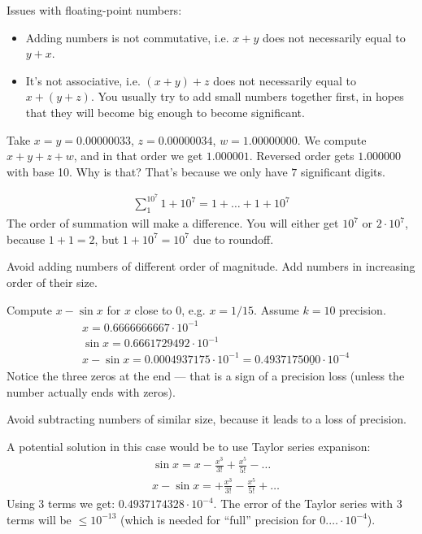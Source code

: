 Issues with floating-point numbers:
\begin{itemize}
    \item {
        Adding numbers is not commutative, i.e.
        $x + y$ does not necessarily equal to $y + x$.
    }
    \item {
        It's not associative, i.e.
        $(x + y) + z$ does not necessarily equal to $x + (y + z)$.
        You usually try to add small numbers together first, in hopes that they 
        will become big enough to become significant.
    }
\end{itemize}
\begin{example}[1]
    Take $x = y = 0.00000033$, $z = 0.00000034$, $w = 1.00000000$.
    We compute $x + y + z + w$, and in that order we get $1.000001$.
    Reversed order gets $1.000000$ with base 10. Why is that?
    That's because we only have $7$ significant digits.
\end{example}
\begin{example}[2]
    \begin{align*}
        \sum_{1}^{10^7} 1 + 10^7 = 1 + \dots + 1 + 10^7
    \end{align*}
    The order of summation will make a difference. You will either get 
    $10^7$ or $2 \cdot 10^7$, because $1 + 1 = 2$, but $1 + 10^7 = 10^7$
    due to roundoff.
\end{example}
\begin{consequence}
    Avoid adding numbers of different order of magnitude.
    Add numbers in increasing order of their size.
\end{consequence}
\begin{example}[3]
    Compute $x - \sin{x}$ for $x$ close to $0$, e.g. $x = 1 / 15$.
    Assume $k = 10$ precision.
    \begin{align*}
        &
        x = 0.6666666667 \cdot 10^{-1}
        \\&
        \sin{x} = 0.6661729492 \cdot 10^{-1}
        \\&
        x - \sin{x} = 0.0004937175 \cdot 10^{-1} = 
        0.4937175\underline{000} \cdot 10^{-4}
    \end{align*}
    Notice the three zeros at the end --- that is a sign of 
    a precision loss (unless the number actually ends with zeros).
    \begin{consequence}
        Avoid subtracting numbers of similar size, because it leads to
        a loss of precision.
    \end{consequence}
    A potential solution in this case would be to use Taylor series expanison:
    \begin{align*}
        &
        \sin{x} = x - \frac{x^3}{3!} + \frac{x^5}{5!} - \dots
        \\&
        x - \sin{x} = +\frac{x^3}{3!} - \frac{x^5}{5!} + \dots
    \end{align*}
    Using 3 terms we get: $0.4937174328 \cdot 10^{-4}$.
    The error of the Taylor series with 3 terms will be 
    $\le 10^{-13}$ (which is needed for ``full'' precision for $0.\ldots \cdot 10^{-4}$).
\end{example}
